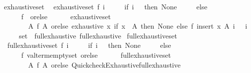 \begin{isabellebody}
\isanewline
{}\isamarkupfalse%
\ exhaustive{\isacharunderscore}{\kern0pt}set\isanewline
{}\isanewline
\ \ {\isachardoublequoteopen}exhaustive{\isacharunderscore}{\kern0pt}set\ f\ i\ {\isacharequal}{\kern0pt}\isanewline
\ \ \ \ {\isacharparenleft}{\kern0pt}if\ i\ {\isacharequal}{\kern0pt}\ {}\ then\ None\isanewline
\ \ \ \ \ else\isanewline
\ \ \ \ \ \ f\ {\isacharbraceleft}{\kern0pt}{\isacharbraceright}{\kern0pt}\ orelse\isanewline
\ \ \ \ \ \ exhaustive{\isacharunderscore}{\kern0pt}set\isanewline
\ \ \ \ \ \ \ \ {\isacharparenleft}{\kern0pt}{\isasymlambda}A{\isachardot}{\kern0pt}\ f\ A\ orelse\ exhaustive\ {\isacharparenleft}{\kern0pt}{\isasymlambda}x{\isachardot}{\kern0pt}\ if\ x\ {\isasymin}\ A\ then\ None\ else\ f\ {\isacharparenleft}{\kern0pt}insert\ x\ A{\isacharparenright}{\kern0pt}{\isacharparenright}{\kern0pt}\ {\isacharparenleft}{\kern0pt}i\ {\isacharminus}{\kern0pt}\ {}{\isacharparenright}{\kern0pt}{\isacharparenright}{\kern0pt}\ {\isacharparenleft}{\kern0pt}i\ {\isacharminus}{\kern0pt}\ {}{\isacharparenright}{\kern0pt}{\isacharparenright}{\kern0pt}{\isachardoublequoteclose}\isanewline
\isanewline
{}\isamarkupfalse%
%
\isadelimproof
\ %
\endisadelimproof
%
\isatagproof
\isacommand{{\isachardot}{\kern0pt}{\isachardot}{\kern0pt}}\isamarkupfalse%
%
\endisatagproof
{\isafoldproof}%
%
\isadelimproof
%
\endisadelimproof
\isanewline
\isanewline
{}\isamarkupfalse%
\isanewline
\isanewline
{}\isamarkupfalse%
\ set\ {\isacharcolon}{\kern0pt}{\isacharcolon}{\kern0pt}\ {\isacharparenleft}{\kern0pt}full{\isacharunderscore}{\kern0pt}exhaustive{\isacharparenright}{\kern0pt}\ full{\isacharunderscore}{\kern0pt}exhaustive\isanewline
{}\isanewline
\isanewline
{}\isamarkupfalse%
\ full{\isacharunderscore}{\kern0pt}exhaustive{\isacharunderscore}{\kern0pt}set\isanewline
{}\isanewline
\ \ {\isachardoublequoteopen}full{\isacharunderscore}{\kern0pt}exhaustive{\isacharunderscore}{\kern0pt}set\ f\ i\ {\isacharequal}{\kern0pt}\isanewline
\ \ \ \ {\isacharparenleft}{\kern0pt}if\ i\ {\isacharequal}{\kern0pt}\ {}\ then\ None\isanewline
\ \ \ \ \ else\isanewline
\ \ \ \ \ \ f\ valterm{\isacharunderscore}{\kern0pt}emptyset\ orelse\isanewline
\ \ \ \ \ \ full{\isacharunderscore}{\kern0pt}exhaustive{\isacharunderscore}{\kern0pt}set\isanewline
\ \ \ \ \ \ \ \ {\isacharparenleft}{\kern0pt}{\isasymlambda}A{\isachardot}{\kern0pt}\ f\ A\ orelse\ Quickcheck{\isacharunderscore}{\kern0pt}Exhaustive{\isachardot}{\kern0pt}full{\isacharunderscore}{\kern0pt}exhaustive\isanewline

\end{isabellebody}
